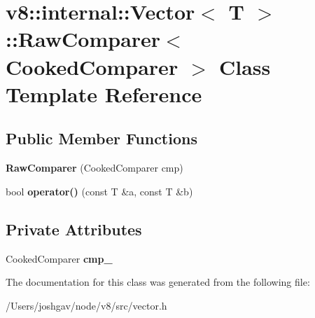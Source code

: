 \hypertarget{classv8_1_1internal_1_1_vector_1_1_raw_comparer}{}\section{v8\+:\+:internal\+:\+:Vector$<$ T $>$\+:\+:Raw\+Comparer$<$ Cooked\+Comparer $>$ Class Template Reference}
\label{classv8_1_1internal_1_1_vector_1_1_raw_comparer}
\subsection*{Public Member Functions}
\begin{DoxyCompactItemize}
\item 
{\bfseries Raw\+Comparer} (Cooked\+Comparer cmp)\hypertarget{classv8_1_1internal_1_1_vector_1_1_raw_comparer_a054ae11fc139411a5a1cc17895e348ae}{}\label{classv8_1_1internal_1_1_vector_1_1_raw_comparer_a054ae11fc139411a5a1cc17895e348ae}

\item 
bool {\bfseries operator()} (const T \&a, const T \&b)\hypertarget{classv8_1_1internal_1_1_vector_1_1_raw_comparer_a5e09e9d19b71995435bad4b8c92154b6}{}\label{classv8_1_1internal_1_1_vector_1_1_raw_comparer_a5e09e9d19b71995435bad4b8c92154b6}

\end{DoxyCompactItemize}
\subsection*{Private Attributes}
\begin{DoxyCompactItemize}
\item 
Cooked\+Comparer {\bfseries cmp\+\_\+}\hypertarget{classv8_1_1internal_1_1_vector_1_1_raw_comparer_a20ea8ee2d235a7745b83ee372f18f83b}{}\label{classv8_1_1internal_1_1_vector_1_1_raw_comparer_a20ea8ee2d235a7745b83ee372f18f83b}

\end{DoxyCompactItemize}


The documentation for this class was generated from the following file\+:\begin{DoxyCompactItemize}
\item 
/\+Users/joshgav/node/v8/src/vector.\+h\end{DoxyCompactItemize}
